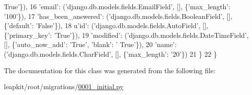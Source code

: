 \begin{DoxyCode}
{      True'}\}),
16             \textcolor{stringliteral}{'email'}: (\textcolor{stringliteral}{'django.db.models.fields.EmailField'}, [], \{\textcolor{stringliteral}{'max\_length'}: \textcolor{stringliteral}{'100'}\}),
17             \textcolor{stringliteral}{'has\_been\_answered'}: (\textcolor{stringliteral}{'django.db.models.fields.BooleanField'}, [], \{\textcolor{stringliteral}{'default'}: \textcolor{stringliteral}{'False'}\}),
18             \textcolor{stringliteral}{u'id'}: (\textcolor{stringliteral}{'django.db.models.fields.AutoField'}, [], \{\textcolor{stringliteral}{'primary\_key'}: \textcolor{stringliteral}{'True'}\}),
19             \textcolor{stringliteral}{'modified'}: (\textcolor{stringliteral}{'django.db.models.fields.DateTimeField'}, [], \{\textcolor{stringliteral}{'auto\_now\_add'}: \textcolor{stringliteral}{'True'}, \textcolor{stringliteral}{'blank'}: \textcolor{stringliteral}{'
      True'}\}),
20             \textcolor{stringliteral}{'name'}: (\textcolor{stringliteral}{'django.db.models.fields.CharField'}, [], \{\textcolor{stringliteral}{'max\_length'}: \textcolor{stringliteral}{'20'}\})
21         \}
22     \}
\end{DoxyCode}


The documentation for this class was generated from the following file\-:\begin{DoxyCompactItemize}
\item 
leapkit/root/migrations/\hyperlink{root_2migrations_20001__initial_8py}{0001\-\_\-initial.\-py}\end{DoxyCompactItemize}
